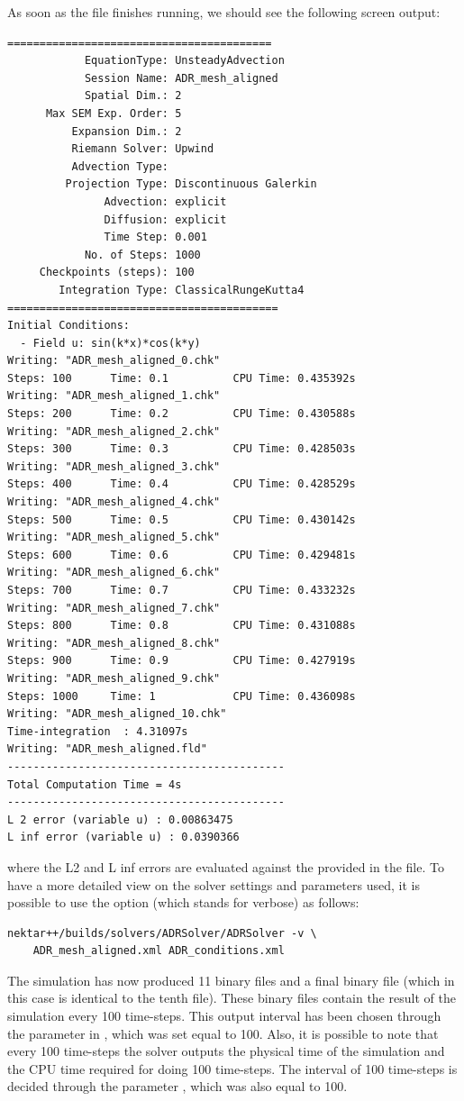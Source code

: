 As soon as the file finishes running, we should see the following screen output:
%
\begin{lstlisting}[style=BashInputStyle]
=========================================
	        EquationType: UnsteadyAdvection
	        Session Name: ADR_mesh_aligned
	        Spatial Dim.: 2
	  Max SEM Exp. Order: 5
	      Expansion Dim.: 2
	      Riemann Solver: Upwind
	      Advection Type: 
	     Projection Type: Discontinuous Galerkin
	           Advection: explicit
	           Diffusion: explicit
	           Time Step: 0.001
	        No. of Steps: 1000
	 Checkpoints (steps): 100
	    Integration Type: ClassicalRungeKutta4
==========================================
Initial Conditions:
  - Field u: sin(k*x)*cos(k*y)
Writing: "ADR_mesh_aligned_0.chk"
Steps: 100      Time: 0.1          CPU Time: 0.435392s
Writing: "ADR_mesh_aligned_1.chk"
Steps: 200      Time: 0.2          CPU Time: 0.430588s
Writing: "ADR_mesh_aligned_2.chk"
Steps: 300      Time: 0.3          CPU Time: 0.428503s
Writing: "ADR_mesh_aligned_3.chk"
Steps: 400      Time: 0.4          CPU Time: 0.428529s
Writing: "ADR_mesh_aligned_4.chk"
Steps: 500      Time: 0.5          CPU Time: 0.430142s
Writing: "ADR_mesh_aligned_5.chk"
Steps: 600      Time: 0.6          CPU Time: 0.429481s
Writing: "ADR_mesh_aligned_6.chk"
Steps: 700      Time: 0.7          CPU Time: 0.433232s
Writing: "ADR_mesh_aligned_7.chk"
Steps: 800      Time: 0.8          CPU Time: 0.431088s
Writing: "ADR_mesh_aligned_8.chk"
Steps: 900      Time: 0.9          CPU Time: 0.427919s
Writing: "ADR_mesh_aligned_9.chk"
Steps: 1000     Time: 1            CPU Time: 0.436098s
Writing: "ADR_mesh_aligned_10.chk"
Time-integration  : 4.31097s
Writing: "ADR_mesh_aligned.fld"
-------------------------------------------
Total Computation Time = 4s
-------------------------------------------
L 2 error (variable u) : 0.00863475
L inf error (variable u) : 0.0390366
\end{lstlisting}
%
where the L2 and L inf errors are evaluated against the  
provided in the  file. To have a more detailed view on the solver settings
and parameters used, it is possible to use the  option (which stands for verbose) as follows:
%
\begin{lstlisting}[style=BashInputStyle]
nektar++/builds/solvers/ADRSolver/ADRSolver -v \
    ADR_mesh_aligned.xml ADR_conditions.xml
\end{lstlisting}
%
The simulation has now produced 11  binary files and a final  binary file (which 
in this case is identical to the tenth \inlsh{.chk} file). These binary files contain the result of the simulation
every 100 time-steps. This output interval has been chosen through the parameter \inltt{IO\_CheckSteps} 
in \inlsh{ADR\_conditions.xml}, which was set equal to 100. Also, it is possible to note that every 100 
time-steps the solver outputs the physical time of the simulation and the CPU time required for doing 
100 time-steps. The interval of 100 time-steps is decided through the parameter \inltt{IO\_InfoSteps}, 
which was also equal to 100.


